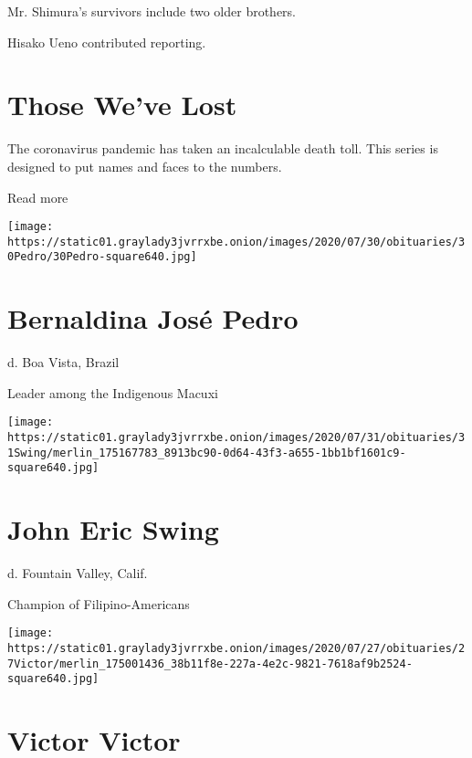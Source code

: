 Mr. Shimura's survivors include two older brothers.

Hisako Ueno contributed reporting.

\href{https://www.nytimes3xbfgragh.onion/interactive/2020/obituaries/people-died-coronavirus-obituaries.html?action=click\&pgtype=Article\&state=default\&region=BELOW_MAIN_CONTENT\&context=covid_obits_promo}{}

\hypertarget{those-weve-lost}{%
\section{Those We've Lost}\label{those-weve-lost}}

The coronavirus pandemic has taken an incalculable death toll. This
series is designed to put names and faces to the numbers.

Read more

\texttt{[image: https://static01.graylady3jvrrxbe.onion/images/2020/07/30/obituaries/30Pedro/30Pedro-square640.jpg]}

\hypertarget{bernaldina-josuxe9-pedro}{%
\section{Bernaldina José Pedro}\label{bernaldina-josuxe9-pedro}}

d. Boa Vista, Brazil

Leader among the Indigenous Macuxi

\texttt{[image: https://static01.graylady3jvrrxbe.onion/images/2020/07/31/obituaries/31Swing/merlin\_175167783\_8913bc90-0d64-43f3-a655-1bb1bf1601c9-square640.jpg]}

\hypertarget{john-eric-swing}{%
\section{John Eric Swing}\label{john-eric-swing}}

d. Fountain Valley, Calif.

Champion of Filipino-Americans

\texttt{[image: https://static01.graylady3jvrrxbe.onion/images/2020/07/27/obituaries/27Victor/merlin\_175001436\_38b11f8e-227a-4e2c-9821-7618af9b2524-square640.jpg]}

\hypertarget{victor-victor}{%
\section{Victor Victor}\label{victor-victor}}

